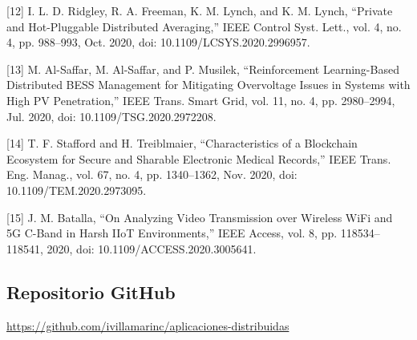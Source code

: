 \documentclass[12pt,a4paper]{article}
\begin{document}
\vspace{0.2cm}

[12]	I. L. D. Ridgley, R. A. Freeman, K. M. Lynch, and K. M. Lynch, “Private and Hot-Pluggable Distributed Averaging,” IEEE Control Syst. Lett., vol. 4, no. 4, pp. 988–993, Oct. 2020, doi: 10.1109/LCSYS.2020.2996957.

\vspace{0.2cm}

[13]	M. Al-Saffar, M. Al-Saffar, and P. Musilek, “Reinforcement Learning-Based Distributed BESS Management for Mitigating Overvoltage Issues in Systems with High PV Penetration,” IEEE Trans. Smart Grid, vol. 11, no. 4, pp. 2980–2994, Jul. 2020, doi: 10.1109/TSG.2020.2972208.

\vspace{0.2cm}

[14]	T. F. Stafford and H. Treiblmaier, “Characteristics of a Blockchain Ecosystem for Secure and Sharable Electronic Medical Records,” IEEE Trans. Eng. Manag., vol. 67, no. 4, pp. 1340–1362, Nov. 2020, doi: 10.1109/TEM.2020.2973095.

\vspace{0.2cm}

[15]	J. M. Batalla, “On Analyzing Video Transmission over Wireless WiFi and 5G C-Band in Harsh IIoT Environments,” IEEE Access, vol. 8, pp. 118534–118541, 2020, doi: 10.1109/ACCESS.2020.3005641.

\vspace{0.2cm}
\subsection*{Repositorio GitHub}

\href{https://github.com/ivillamarinc/aplicaciones-distribuidas}{https://github.com/ivillamarinc/aplicaciones-distribuidas}
\end{document}
